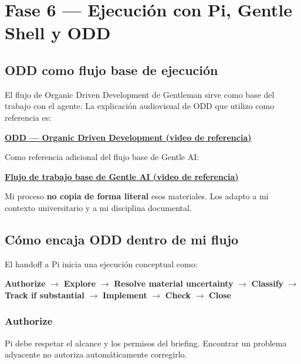 \documentclass[11pt,a4paper]{article}
\begin{document}
\section{Fase 6 — Ejecución con Pi, Gentle Shell y ODD}

\subsection{ODD como flujo base de ejecución}

El flujo de Organic Driven Development de Gentleman sirve como base del trabajo con el agente. La explicación audiovisual de ODD que utilizo como referencia es:

\begin{center}
\href{https://www.youtube.com/watch?v=WM2JAuR-MOU}
{\textbf{ODD — Organic Driven Development (video de referencia)}}
\end{center}

Como referencia adicional del flujo base de Gentle AI:

\begin{center}
\href{https://www.youtube.com/watch?v=-8neJsLJsXo\&t=3036s}
{\textbf{Flujo de trabajo base de Gentle AI (video de referencia)}}
\end{center}

Mi proceso \textbf{no copia de forma literal} esos materiales. Los adapto a mi contexto universitario y a mi disciplina documental.

\subsection{Cómo encaja ODD dentro de mi flujo}

El handoff a Pi inicia una ejecución conceptual como:

\begin{center}
\textbf{Authorize}
\(\rightarrow\)
\textbf{Explore}
\(\rightarrow\)
\textbf{Resolve material uncertainty}
\(\rightarrow\)
\textbf{Classify}
\(\rightarrow\)
\textbf{Track if substantial}
\(\rightarrow\)
\textbf{Implement}
\(\rightarrow\)
\textbf{Check}
\(\rightarrow\)
\textbf{Close}
\end{center}

\subsubsection{Authorize}

Pi debe respetar el alcance y los permisos del briefing. Encontrar un problema adyacente no autoriza automáticamente corregirlo.
\end{document}
